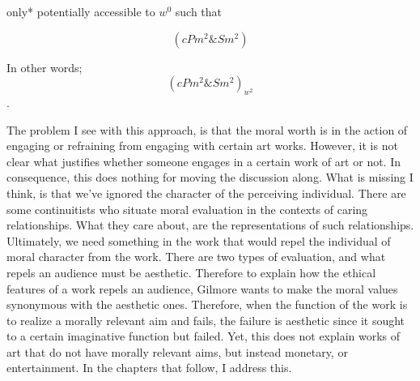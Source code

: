 \documentclass[
  letterpaper,
  DIV=11,
  numbers=noendperiod]{scrartcl}
\theoremstyle{remark}
\begin{document}
\noindent *only* potentially accessible to \(w^{0}\) such that

\[( cPm^{2} \& Sm^{2} )\]

\noindent In other words; \[( cPm^{2} \& Sm^{2} )_{w^{2}}\].

The problem I see with this approach, is that the moral worth is in the
action of engaging or refraining from engaging with certain art works.
However, it is not clear what justifies whether someone engages in a
certain work of art or not. In consequence, this does nothing for moving
the discussion along. What is missing I think, is that we've ignored the
character of the perceiving individual. There are some continuitists who
situate moral evaluation in the contexts of caring relationships. What
they care about, are the representations of such relationships.
Ultimately, we need something in the work that would repel the
individual of moral character from the work. There are two types of
evaluation, and what repels an audience must be aesthetic. Therefore to
explain how the ethical features of a work repels an audience, Gilmore
wants to make the moral values synonymous with the aesthetic ones.
Therefore, when the function of the work is to realize a morally
relevant aim and fails, the failure is aesthetic since it sought to a
certain imaginative function but failed. Yet, this does not explain
works of art that do not have morally relevant aims, but instead
monetary, or entertainment. In the chapters that follow, I address this.

\newpage
\end{document}
